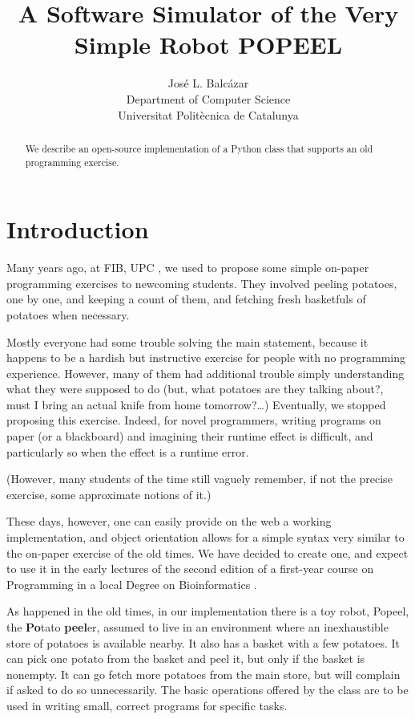 \documentclass[12pt]{article}
\title{A Software Simulator of the Very Simple Robot POPEEL%
}
\author{Jos\'e L. Balc\'azar \\
{Department of Computer Science} \\
{Universitat Polit\`ecnica de Catalunya}}
\begin{document}
\maketitle

\begin{abstract}
We describe an open-source implementation of a
Python class that supports an old programming
exercise.
\end{abstract}


\section{Introduction}%

Many years ago, at FIB, UPC \cite{FIB}, we used to 
propose some simple on-paper programming exercises 
to newcoming students. They involved peeling potatoes, 
one by one, and keeping a count of them, and fetching 
fresh basketfuls of potatoes when necessary. 

Mostly everyone had some trouble solving the main
statement, because it happens to be a hardish but 
instructive exercise for people with no programming 
experience. However, many of them had additional 
trouble simply understanding what they were supposed 
to do \cite{PBblog} (but, what potatoes are they 
talking about?, must I bring an actual knife from 
home tomorrow?\dots) Eventually, we stopped proposing 
this exercise. Indeed, for novel programmers, writing 
programs on paper (or a blackboard) and imagining 
their runtime effect is difficult, and particularly so 
when the effect is a runtime error.

(However, many students of the time still vaguely
remember, if not the precise exercise, some approximate
notions of it.)

These days, however, one can easily provide on the 
web a working implementation, and object orientation
allows for a simple syntax very similar to the 
on-paper exercise of the old times. We have decided
to create one, and expect to use it in the early
lectures of the second edition of a first-year
course on Programming \cite{mireport} in a local 
Degree on Bioinformatics \cite{BDBI}.

As happened in the old times, in our implementation
there is a toy robot, Popeel, the 
{\bf Po}tato {\bf peel}er, assumed to live in an 
environment where an inexhaustible store of potatoes 
is available nearby. It also has a basket with a few 
potatoes. It can pick one potato from the basket and 
peel it, but only if the basket is nonempty. It can go 
fetch more potatoes from the main store, but will complain 
if asked to do so unnecessarily. The basic operations
offered by the class are to be used in writing small,
correct programs for specific tasks.
\end{document}
